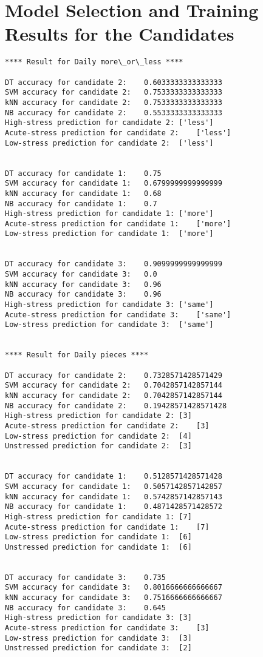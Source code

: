 \chapter{Model Selection and Training Results for the Candidates}\label{training-result}
\begin{lstlisting}
**** Result for Daily more\_or\_less ****

DT accuracy for candidate 2:	0.6033333333333333
SVM accuracy for candidate 2:	0.7533333333333333
kNN accuracy for candidate 2:	0.7533333333333333
NB accuracy for candidate 2:	0.5533333333333333
High-stress prediction for candidate 2:	['less']
Acute-stress prediction for candidate 2:	['less']
Low-stress prediction for candidate 2:	['less']


DT accuracy for candidate 1:	0.75
SVM accuracy for candidate 1:	0.6799999999999999
kNN accuracy for candidate 1:	0.68
NB accuracy for candidate 1:	0.7
High-stress prediction for candidate 1:	['more']
Acute-stress prediction for candidate 1:	['more']
Low-stress prediction for candidate 1:	['more']


DT accuracy for candidate 3:	0.9099999999999999
SVM accuracy for candidate 3:	0.0
kNN accuracy for candidate 3:	0.96
NB accuracy for candidate 3:	0.96
High-stress prediction for candidate 3:	['same']
Acute-stress prediction for candidate 3:	['same']
Low-stress prediction for candidate 3:	['same']


**** Result for Daily pieces ****

DT accuracy for candidate 2:	0.7328571428571429
SVM accuracy for candidate 2:	0.7042857142857144
kNN accuracy for candidate 2:	0.7042857142857144
NB accuracy for candidate 2:	0.19428571428571428
High-stress prediction for candidate 2:	[3]
Acute-stress prediction for candidate 2:	[3]
Low-stress prediction for candidate 2:	[4]
Unstressed prediction for candidate 2:	[3]


DT accuracy for candidate 1:	0.5128571428571428
SVM accuracy for candidate 1:	0.5057142857142857
kNN accuracy for candidate 1:	0.5742857142857143
NB accuracy for candidate 1:	0.4871428571428572
High-stress prediction for candidate 1:	[7]
Acute-stress prediction for candidate 1:	[7]
Low-stress prediction for candidate 1:	[6]
Unstressed prediction for candidate 1:	[6]


DT accuracy for candidate 3:	0.735
SVM accuracy for candidate 3:	0.8016666666666667
kNN accuracy for candidate 3:	0.7516666666666667
NB accuracy for candidate 3:	0.645
High-stress prediction for candidate 3:	[3]
Acute-stress prediction for candidate 3:	[3]
Low-stress prediction for candidate 3:	[3]
Unstressed prediction for candidate 3:	[2]



\end{lstlisting}
